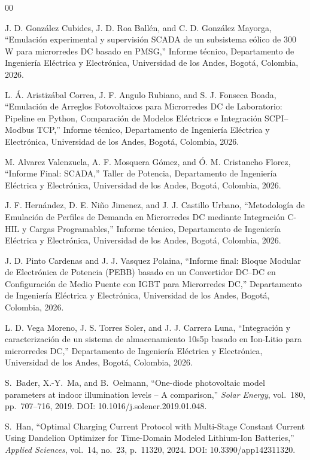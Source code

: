 \documentclass[conference]{IEEEtran}
\begin{document}
\begin{thebibliography}{00}

J. D. González Cubides, J. D. Roa Ballén, and C. D. González Mayorga, ``Emulación experimental y supervisión SCADA de un subsistema eólico de 300 W para microrredes DC basado en PMSG,'' Informe técnico, Departamento de Ingeniería Eléctrica y Electrónica, Universidad de los Andes, Bogotá, Colombia, 2026.

L. Á. Aristizábal Correa, J. F. Angulo Rubiano, and S. J. Fonseca Boada, ``Emulación de Arreglos Fotovoltaicos para Microrredes DC de Laboratorio: Pipeline en Python, Comparación de Modelos Eléctricos e Integración SCPI--Modbus TCP,'' Informe técnico, Departamento de Ingeniería Eléctrica y Electrónica, Universidad de los Andes, Bogotá, Colombia, 2026.

M. Alvarez Valenzuela, A. F. Mosquera Gómez, and Ó. M. Cristancho Florez, ``Informe Final: SCADA,'' Taller de Potencia, Departamento de Ingeniería Eléctrica y Electrónica, Universidad de los Andes, Bogotá, Colombia, 2026.

J. F. Hernández, D. E. Niño Jimenez, and J. J. Castillo Urbano, ``Metodología de Emulación de Perfiles de Demanda en Microrredes DC mediante Integración C-HIL y Cargas Programables,'' Informe técnico, Departamento de Ingeniería Eléctrica y Electrónica, Universidad de los Andes, Bogotá, Colombia, 2026.

J. D. Pinto Cardenas and J. J. Vasquez Polaina, ``Informe final: Bloque Modular de Electrónica de Potencia (PEBB) basado en un Convertidor DC--DC en Configuración de Medio Puente con IGBT para Microrredes DC,'' Departamento de Ingeniería Eléctrica y Electrónica, Universidad de los Andes, Bogotá, Colombia, 2026.

L. D. Vega Moreno, J. S. Torres Soler, and J. J. Carrera Luna, ``Integración y caracterización de un sistema de almacenamiento 10s5p basado en Ion-Litio para microrredes DC,'' Departamento de Ingeniería Eléctrica y Electrónica, Universidad de los Andes, Bogotá, Colombia, 2026.

S.~Bader, X.-Y.~Ma, and B.~Oelmann, ``One-diode photovoltaic model parameters at indoor illumination levels -- A comparison,'' \emph{Solar Energy}, vol.~180, pp.~707--716, 2019. DOI: 10.1016/j.solener.2019.01.048.

S.~Han, ``Optimal Charging Current Protocol with Multi-Stage Constant Current Using Dandelion Optimizer for Time-Domain Modeled Lithium-Ion Batteries,'' \emph{Applied Sciences}, vol.~14, no.~23, p.~11320, 2024. DOI: 10.3390/app142311320.


\end{thebibliography}
\end{document}

